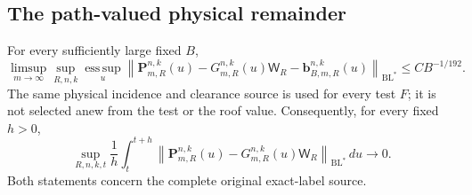 \subsection{The path-valued physical remainder}
\begin{theorem}
\label{thm:v52-path-remainder}
For every sufficiently large fixed $B$,
\begin{equation}\label{eq:v52-path-remainder}
 \limsup_{m\to\infty}\sup_{R,n,k}\operatorname*{ess\,sup}_{u}
 \left\|\mathbf P_{m,R}^{n,k}(u)
       -G_{m,R}^{n,k}(u)\mathsf W_R
       -\mathbf b_{B,m,R}^{n,k}(u)\right\|_{\mathrm{BL}^*}
                                          \le CB^{-1/192}.
\end{equation}
The same physical incidence and clearance source is used for every
test $F$; it is not selected anew from the test or the roof value.
Consequently, for every fixed $h>0$,
\begin{equation}\label{eq:v52-path-local-variation}
 \sup_{R,n,k,t}\frac1h\int_t^{t+h}
 \left\|\mathbf P_{m,R}^{n,k}(u)
       -G_{m,R}^{n,k}(u)\mathsf W_R\right\|_{\mathrm{BL}^*}\,du
                                               \longrightarrow0.
\end{equation}
Both statements concern the complete original exact-label source.
\end{theorem}
